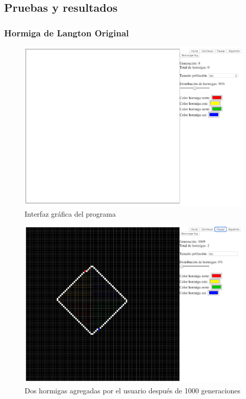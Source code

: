 \subsection{Pruebas y resultados}
	\subsubsection{Hormiga de Langton Original}
		\begin{figure}[H]
			\begin{center}
				\includegraphics[scale=.3]{HL/img/interfaz.png}
				\caption{Interfaz gráfica del programa}
				\label{fig:hl1}
			\end{center}
		\end{figure}

		\begin{figure}[H]
			\begin{center}
				\includegraphics[scale=.3]{HL/img/dos.png}
				\caption{Dos hormigas agregadas por el usuario después de 1000 generaciones}
				\label{fig:hl1}
			\end{center}
		\end{figure}

